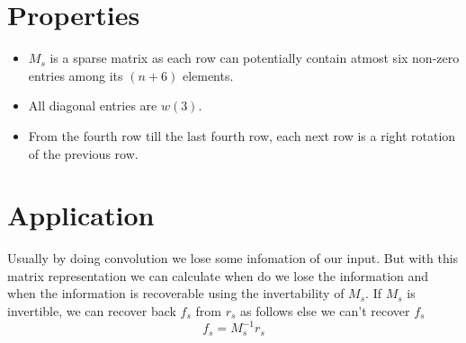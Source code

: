 \documentclass[a4paper,landscape]{article}
\begin{document}
\section{Properties}
\begin{itemize}
    \item $M_s$ is a sparse matrix as each row can potentially contain atmost six non-zero entries among its $(n+6)$ elements.
    \item All diagonal entries are $w(3)$.
    \item From the fourth row till the last fourth row, each next row is a right rotation of the previous row.
\end{itemize}
\section{Application}
Usually by doing convolution we lose some infomation of our input. But  with  this matrix representation we can calculate when do we lose the information and when the information is recoverable using the invertability of $M_s$. If $M_s$ is invertible, we can recover back $f_s$ from $r_s$ as follows else we can't recover $f_s$
\[f_s=M_s^{-1}r_s\]
\end{document}
